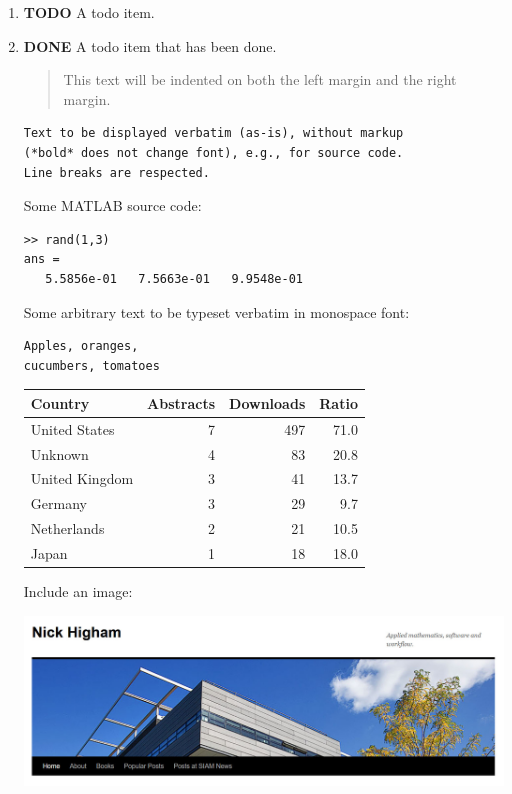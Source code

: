 \documentclass[11pt]{article}
\begin{document}
\begin{enumerate}
\item {\bfseries\sffamily TODO} A todo item.
\label{sec:orgb5466eb}
\item {\bfseries\sffamily DONE} A todo item that has been done.
\label{sec:org34844ef}

\begin{quote}
This text will be indented on both the left margin and the right margin.
\end{quote}

\begin{verbatim}
Text to be displayed verbatim (as-is), without markup 
(*bold* does not change font), e.g., for source code. 
Line breaks are respected. 
\end{verbatim}

Some MATLAB source code:
\begin{verbatim}
>> rand(1,3)
ans =
   5.5856e-01   7.5663e-01   9.9548e-01
\end{verbatim}

Some arbitrary text to be typeset verbatim in monospace font:
\begin{verbatim}
Apples, oranges,
cucumbers, tomatoes
\end{verbatim}

\begin{center}
\begin{tabular}{lrrr}
\hline
Country & Abstracts & Downloads & Ratio\\
\hline
United States & 7 & 497 & 71.0\\
Unknown & 4 & 83 & 20.8\\
United Kingdom & 3 & 41 & 13.7\\
Germany & 3 & 29 & 9.7\\
Netherlands & 2 & 21 & 10.5\\
Japan & 1 & 18 & 18.0\\
\hline
\end{tabular}
\end{center}

Include an image:
\begin{center}
\includegraphics[width=.9\linewidth]{nickhighamwordpress.jpg}
\end{center}
\end{enumerate}
\end{document}
